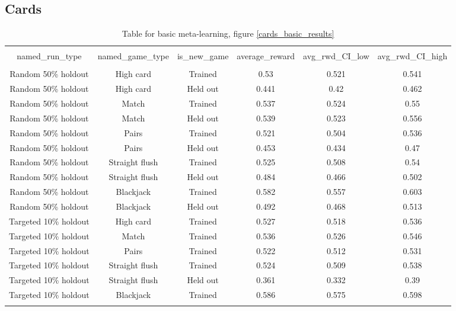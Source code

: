 \subsection{Cards}
\begin{table}[H]
\scriptsize
\centering
\begin{tabular}{@{\extracolsep{5pt}} cccccc}
\\[-1.8ex]\hline
\hline \\[-1.8ex]
named\_run\_type & named\_game\_type & is\_new\_game & average\_reward & avg\_rwd\_CI\_low & avg\_rwd\_CI\_high \\
\hline \\[-1.8ex]
Random 50\% holdout & High card & Trained & 0.53 & 0.521 & 0.541 \\
Random 50\% holdout & High card & Held out & 0.441 & 0.42 & 0.462 \\
Random 50\% holdout & Match & Trained & 0.537 & 0.524 & 0.55 \\
Random 50\% holdout & Match & Held out & 0.539 & 0.523 & 0.556 \\
Random 50\% holdout & Pairs & Trained & 0.521 & 0.504 & 0.536 \\
Random 50\% holdout & Pairs & Held out & 0.453 & 0.434 & 0.47 \\
Random 50\% holdout & Straight flush & Trained & 0.525 & 0.508 & 0.54 \\
Random 50\% holdout & Straight flush & Held out & 0.484 & 0.466 & 0.502 \\
Random 50\% holdout & Blackjack & Trained & 0.582 & 0.557 & 0.603 \\
Random 50\% holdout & Blackjack & Held out & 0.492 & 0.468 & 0.513 \\
Targeted 10\% holdout & High card & Trained & 0.527 & 0.518 & 0.536 \\
Targeted 10\% holdout & Match & Trained & 0.536 & 0.526 & 0.546 \\
Targeted 10\% holdout & Pairs & Trained & 0.522 & 0.512 & 0.531 \\
Targeted 10\% holdout & Straight flush & Trained & 0.524 & 0.509 & 0.538 \\
Targeted 10\% holdout & Straight flush & Held out & 0.361 & 0.332 & 0.39 \\
Targeted 10\% holdout & Blackjack & Trained & 0.586 & 0.575 & 0.598 \\
\hline \\[-1.8ex]
\end{tabular}
\caption{Table for basic meta-learning, figure \ref{cards_basic_results}}
\end{table}

